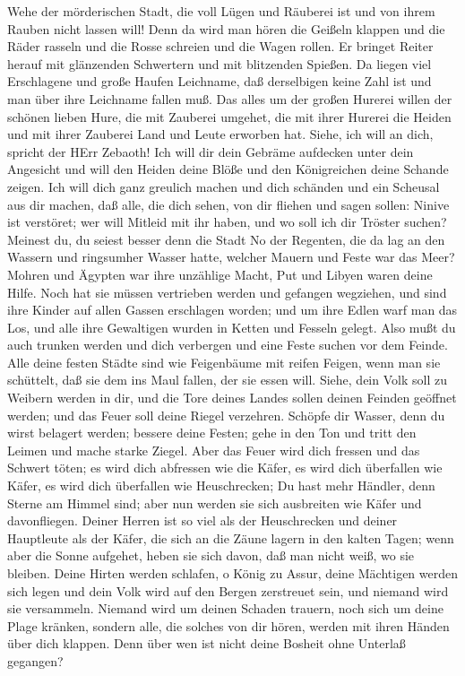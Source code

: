  Wehe der mörderischen Stadt, die voll Lügen und Räuberei
ist und von ihrem Rauben nicht lassen will!  Denn da wird
man hören die Geißeln klappen und die Räder rasseln und die Rosse
schreien und die Wagen rollen.  Er bringet Reiter herauf mit
glänzenden Schwertern und mit blitzenden Spießen. Da liegen viel
Erschlagene und große Haufen Leichname, daß derselbigen keine Zahl ist
und man über ihre Leichname fallen muß.  Das alles um der
großen Hurerei willen der schönen lieben Hure, die mit Zauberei umgehet,
die mit ihrer Hurerei die Heiden und mit ihrer Zauberei Land und Leute
erworben hat.  Siehe, ich will an dich, spricht der HErr
Zebaoth! Ich will dir dein Gebräme aufdecken unter dein Angesicht und
will den Heiden deine Blöße und den Königreichen deine Schande zeigen.
 Ich will dich ganz greulich machen und dich schänden und
ein Scheusal aus dir machen,  daß alle, die dich sehen, von
dir fliehen und sagen sollen: Ninive ist verstöret; wer will Mitleid mit
ihr haben, und wo soll ich dir Tröster suchen?  Meinest du,
du seiest besser denn die Stadt No der Regenten, die da lag an den
Wassern und ringsumher Wasser hatte, welcher Mauern und Feste war das
Meer?  Mohren und Ägypten war ihre unzählige Macht, Put und
Libyen waren deine Hilfe.  Noch hat sie müssen vertrieben
werden und gefangen wegziehen, und sind ihre Kinder auf allen Gassen
erschlagen worden; und um ihre Edlen warf man das Los, und alle ihre
Gewaltigen wurden in Ketten und Fesseln gelegt.  Also mußt
du auch trunken werden und dich verbergen und eine Feste suchen vor dem
Feinde.  Alle deine festen Städte sind wie Feigenbäume mit
reifen Feigen, wenn man sie schüttelt, daß sie dem ins Maul fallen, der
sie essen will.  Siehe, dein Volk soll zu Weibern werden in
dir, und die Tore deines Landes sollen deinen Feinden geöffnet werden;
und das Feuer soll deine Riegel verzehren.  Schöpfe dir
Wasser, denn du wirst belagert werden; bessere deine Festen; gehe in den
Ton und tritt den Leimen und mache starke Ziegel.  Aber das
Feuer wird dich fressen und das Schwert töten; es wird dich abfressen
wie die Käfer, es wird dich überfallen wie Käfer, es wird dich
überfallen wie Heuschrecken;  Du hast mehr Händler, denn
Sterne am Himmel sind; aber nun werden sie sich ausbreiten wie Käfer und
davonfliegen.  Deiner Herren ist so viel als der
Heuschrecken und deiner Hauptleute als der Käfer, die sich an die Zäune
lagern in den kalten Tagen; wenn aber die Sonne aufgehet, heben sie sich
davon, daß man nicht weiß, wo sie bleiben.  Deine Hirten
werden schlafen, o König zu Assur, deine Mächtigen werden sich legen und
dein Volk wird auf den Bergen zerstreuet sein, und niemand wird sie
versammeln.  Niemand wird um deinen Schaden trauern, noch
sich um deine Plage kränken, sondern alle, die solches von dir hören,
werden mit ihren Händen über dich klappen. Denn über wen ist nicht deine
Bosheit ohne Unterlaß gegangen?
